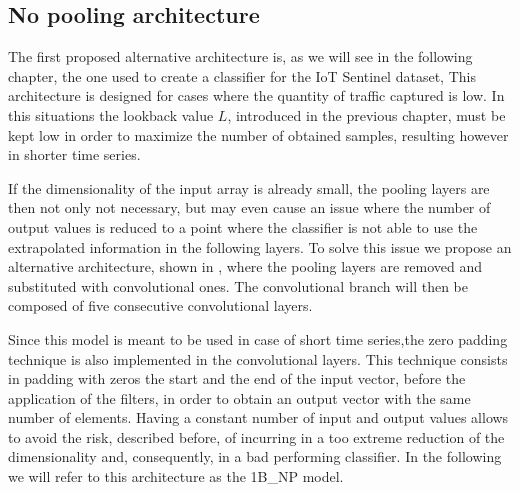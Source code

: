 \subsection{No pooling architecture}\label{npmodels}

The first proposed alternative architecture is, as we will see in the following chapter, the one used to create a classifier for the IoT Sentinel dataset, This architecture is designed for cases where the quantity of traffic captured is low. In this situations the lookback value $L$, introduced in the previous chapter, must be kept low in order to maximize the number of obtained samples, resulting however in shorter time series. 

If the dimensionality of the input array is already small, the pooling layers are then not only not necessary, but may even cause an issue where the number of output values is reduced to a point where the classifier is not able to use the extrapolated information in the following layers.
To solve this issue we propose an alternative architecture, shown in , where the pooling layers are removed and substituted with convolutional ones. The convolutional branch will then be composed of five consecutive convolutional layers.

Since this model is meant to be used in case of short time series,the zero padding technique is also implemented in the convolutional layers. This technique consists in padding with zeros the start and the end of the input vector, before the application of the filters, in order to obtain an output vector with the same number of elements. Having a constant number of input and output values allows to avoid the risk, described before, of incurring in a too extreme reduction of the dimensionality and, consequently, in a bad performing classifier.
In the following we will refer to this architecture as the 1B\_NP model. 

